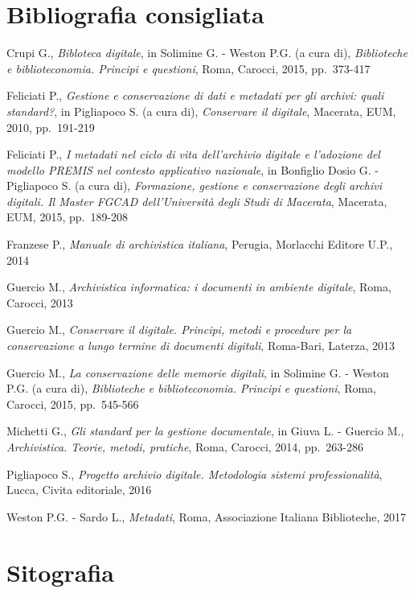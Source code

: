 \documentclass[
  b5paper,
  twoside,
  12pt,
  chapterprefix=false,
  bibliography=totocnumbered,
  parskip=false]{scrbook}
\begin{document}
\hypertarget{bibliografia-consigliata-15}{%
\section*{Bibliografia consigliata}\label{bibliografia-consigliata-15}}

Crupi G., \emph{Bibloteca digitale}, in Solimine G. - Weston P.G. (a cura
di), \emph{Biblioteche e biblioteconomia. Principi e questioni}, Roma,
Carocci, 2015, pp.~373-417

Feliciati P., \emph{Gestione e conservazione di dati e metadati per gli
archivi: quali standard?}, in Pigliapoco S. (a cura di), \emph{Conservare il
digitale}, Macerata, EUM, 2010, pp.~191-219

Feliciati P., \emph{I metadati nel ciclo di vita dell'archivio digitale e
l'adozione del modello PREMIS nel contesto applicativo nazionale}, in
Bonfiglio Dosio G. - Pigliapoco S. (a cura di), \emph{Formazione, gestione e
conservazione degli archivi digitali. Il Master FGCAD dell'Università
degli Studi di Macerata}, Macerata, EUM, 2015, pp.~189-208

Franzese P., \emph{Manuale di archivistica italiana}, Perugia, Morlacchi
Editore U.P., 2014

Guercio M., \emph{Archivistica informatica: i documenti in ambiente
digitale}, Roma, Carocci, 2013

Guercio M., \emph{Conservare il digitale. Principi, metodi e procedure per la
conservazione a lungo termine di documenti digitali}, Roma-Bari,
Laterza, 2013

Guercio M., \emph{La conservazione delle memorie digitali}, in Solimine G. -
Weston P.G. (a cura di), \emph{Biblioteche e biblioteconomia. Principi e
questioni}, Roma, Carocci, 2015, pp.~545-566

Michetti G., \emph{Gli standard per la gestione documentale}, in Giuva L. -
Guercio M., \emph{Archivistica. Teorie, metodi, pratiche}, Roma, Carocci, 2014, pp.~263-286

Pigliapoco S., \emph{Progetto archivio digitale. Metodologia sistemi
professionalità}, Lucca, Civita editoriale, 2016

Weston P.G. - Sardo L., \emph{Metadati}, Roma, Associazione Italiana
Biblioteche, 2017

\hypertarget{sitografia-22}{%
\section*{Sitografia}\label{sitografia-22}}
\end{document}
